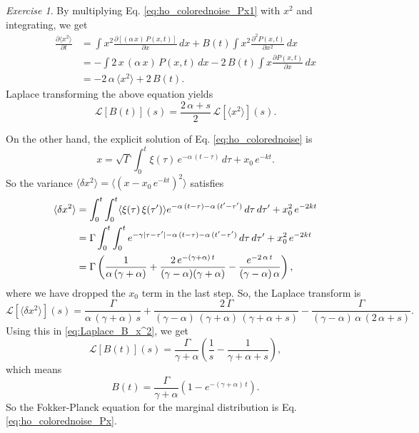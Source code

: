 \documentclass{book}
\numberwithin{equation}{section}
\theoremstyle{plain}
\theoremstyle{definition}
\theoremstyle{remark}
\newtheorem{exercise}{Exercise}
\begin{document}
\begin{exercise}
{    By multiplying Eq. \eqref{eq:ho_colorednoise_Px1} with $x^2$ and integrating,
    we get
    $$
    \begin{aligned}
    \frac{ \partial \langle x^2 \rangle } { \partial t }
    &=
    \int x^2 \frac{ \partial [(\alpha \, x) \, P(x, t) ] } { \partial x} \, dx
    + B(t) \int x^2 \frac{ \partial^2 P(x, t) } { \partial x^2 } \, dx
    \\
    &=
    -\int 2 \, x \, (\alpha \, x) \, P(x, t) \, dx
    - 2 \, B(t) \int x \frac{ \partial P(x, t) } { \partial x } \, dx
    \\
    &=
    - 2 \, \alpha \, \langle x^2 \rangle
    + 2 \, B(t).
    \end{aligned}
    $$
    Laplace transforming the above equation yields
    \begin{equation}
    \mathcal L[ B(t) ](s) = \frac{2 \, \alpha + s}{2} \, \mathcal L[\langle x^2 \rangle](s).
    \label{eq:Laplace_B_x^2}
    \end{equation}

    On the other hand,
    the explicit solution of Eq. \eqref{eq:ho_colorednoise} is
    $$
    x = \sqrt{\Gamma} \int_0^t \xi(\tau) \, e^{-\alpha \, (t-\tau)}  \, d\tau
      + x_0 \, e^{-kt}.
    $$
    So the variance $\langle \delta x^2 \rangle = \langle (x - x_0 \, e^{-kt})^2 \rangle$
    satisfies
    \begin{align}
    \langle \delta x^2 \rangle
    &=
    \int_0^t\int_0^t \langle \xi(\tau) \, \xi(\tau') \rangle
    e^{-\alpha \, (t-\tau)- \alpha \, (t'-\tau')} \, d\tau \, d\tau'
    +
    x_0^2 \, e^{-2kt}
    \notag \\
    &=
    \Gamma \int_0^t\int_0^t
    e^{-\gamma|\tau - \tau'|-\alpha \, (t-\tau) - \alpha \, (t'-\tau')} \, d\tau \, d\tau'
    +
    x_0^2 \, e^{-2kt}
    \notag \\
    &=
    \Gamma
    \left(
      \frac{1}{\alpha \,(\gamma + \alpha) }
      +
      \frac{2 \, e^{-(\gamma + \alpha) \, t} }{(\gamma - \alpha) (\gamma + \alpha) }
      -
      \frac{e^{-2 \, \alpha \, t} }{(\gamma - \alpha) \, \alpha }
    \right),
    \label{eq:ho_colorednoise_var}
    \end{align}
    where we have dropped the $x_0$ term in the last step.
    So, the Laplace transform is
    $$
    \mathcal L[\langle \delta x^2 \rangle](s)
    =
      \frac{ \Gamma } { \alpha \, (\gamma + \alpha) \, s }
      +
      \frac{ 2 \, \Gamma } { (\gamma - \alpha) \, (\gamma + \alpha) \, (\gamma + \alpha + s) }
      -
      \frac{ \Gamma } { (\gamma - \alpha ) \, \alpha \, (2 \, \alpha + s) }.
    $$
    Using this in \eqref{eq:Laplace_B_x^2}, we get
    $$
    \mathcal L[B(t)](s) =
      \frac{ \Gamma }{ \gamma + \alpha }
      \left( \frac{1}{s} - \frac{1}{ \gamma + \alpha + s } \right),
    $$
    which means
    $$
    B(t) = \frac{ \Gamma } { \gamma + \alpha } \left( 1 - e^{-(\gamma + \alpha) \,t} \right).
    $$
    So the Fokker-Planck equation for the marginal distribution is
    Eq. \eqref{eq:ho_colorednoise_Px}.
  }


\end{exercise}
\end{document}

